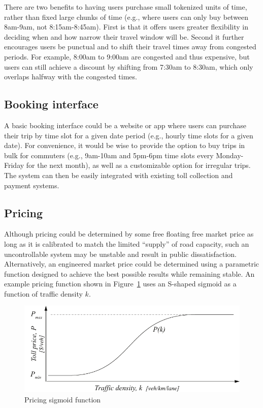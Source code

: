 \documentclass[10pt, letter, twocolumn]{article} %
\begin{document}
There are two benefits to having users purchase small tokenized units of time, rather than fixed large chunks of time (e.g., where users can only buy between 8am-9am, not 8:15am-8:45am). First is that it offers users greater flexibility in deciding when and how narrow their travel window will be. Second it further encourages users be punctual and to shift their travel times away from congested periods. For example, 8:00am to 9:00am are congested and thus expensive, but users can still achieve a discount by shifting from 7:30am to 8:30am, which only overlaps halfway with the congested times.

\subsection{Booking interface}
A basic booking interface could be a website or app where users can purchase their trip by time slot for a given date period (e.g., hourly time slots for a given date). For convenience, it would be wise to provide the option to buy trips in bulk for commuters (e.g., 9am-10am and 5pm-6pm time slots every Monday-Friday for the next month), as well as a customizable option for irregular trips. The system can then be easily integrated with existing toll collection and payment systems.

\subsection{Pricing}
Although pricing could be determined by some free floating free market price as long as it is calibrated to match the limited ``supply'' of road capacity, such an uncontrollable system may be unstable and result in public dissatisfaction. Alternatively, an engineered market price could be determined using a parametric function designed to achieve the best possible results while remaining stable. An example pricing function shown in Figure~\ref{fig:costflow} uses an S-shaped sigmoid as a function of traffic density $k$. 

\begin{figure}[h]
	\includegraphics[width=\linewidth]{figures/costdensity}
	\centering
	\caption{Pricing sigmoid function}
	\label{fig:costflow}
\end{figure}
\end{document}
